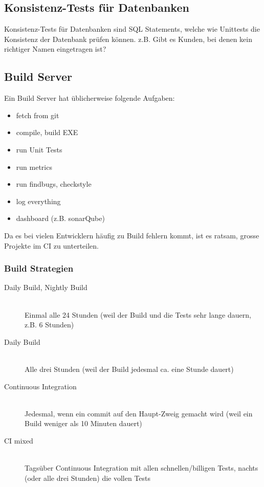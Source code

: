 \subsection{Konsistenz-Tests für Datenbanken}

Konsistenz-Tests für Datenbanken sind SQL Statements, welche wie Unittests die Konsistenz der Datenbank prüfen können. z.B. Gibt es Kunden, bei denen kein richtiger Namen eingetragen ist?


\subsection{Build Server}

Ein Build Server hat üblicherweise folgende Aufgaben:
\begin{itemize}
	\item fetch from git
	\item compile, build EXE
	\item run Unit Tests
	\item run metrics
	\item run findbugs, checkstyle
	\item log everything
	\item dashboard (z.B. sonarQube)
\end{itemize}

Da es bei vielen Entwicklern häufig zu Build fehlern kommt, ist es ratsam, grosse Projekte im CI zu unterteilen.


\subsubsection{Build Strategien}
\begin{description}
	\item[Daily Build, Nightly Build] \hfill \\ Einmal alle 24 Stunden (weil der Build und die Tests sehr lange dauern, z.B. 6 Stunden)
	\item[Daily Build] \hfill \\ Alle drei Stunden (weil der Build jedesmal ca. eine Stunde dauert)
	\item[Continuous Integration] \hfill \\ Jedesmal, wenn ein commit auf den Haupt-Zweig gemacht wird (weil ein Build weniger als 10 Minuten dauert)
	\item[CI mixed] \hfill \\ Tagsüber Continuous Integration mit allen schnellen/billigen Tests, nachts (oder alle drei Stunden) die vollen Tests
\end{description}

